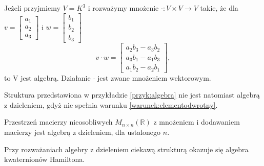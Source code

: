 \begin{przyklad}
Jeżeli przyjmiemy $V=K^3$ i rozważymy mnożenie $\cdot : V \times V
\longrightarrow V$ takie, że dla $v=\left[ 
\begin{array}{l}
a_1\\
a_2\\
a_3
\end{array} \right] 
$ i $w=\left[ 
\begin{array}{l}
b_1\\
b_2\\
b_3
\end{array} \right]$ 
$$v \cdot w = \left[ 
\begin{array}{l}
a_{2}b_{3} - a_{3}b_{2}\\
a_{3}b_{1} - a_{1}b_{3}\\
a_{1}b_{2} - a_{2}b_{1}
\end{array} \right], $$
to V jest algebrą. Działanie $\cdot$ jest zwane mnożeniem wektorowym.
\label{przyk:algebra}
\end{przyklad}
Struktura przedstawiona w przykładzie \ref{przyk:algebra} nie jest natomiast
algebrą z dzieleniem, gdyż nie spełnia warunku \ref{warunek:elementodwrotny}.

\begin{przyklad}
Przestrzeń macierzy nieosobliwych $M_{n \times n}\left( \mathbb{R} \right)$ z
mnożeniem i dodawaniem macierzy jest algebrą z dzieleniem, dla ustalonego $n$. 
\end{przyklad}

Przy rozważaniach algebry z dzieleniem ciekawą strukturą okazuje się algebra
kwaternionów Hamiltona.

